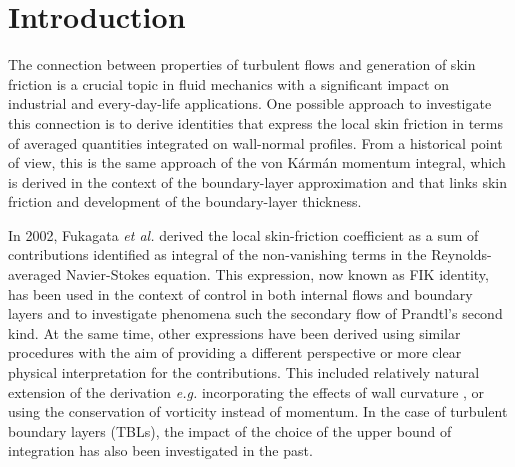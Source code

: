 

\section{Introduction}
The connection between properties of turbulent flows and generation of skin friction is a crucial topic in fluid mechanics with a significant impact on industrial and every-day-life applications. One possible approach to investigate this connection is to derive identities that express the local skin friction in terms of averaged quantities integrated on wall-normal profiles. From a historical point of view, this is the same approach of the von K\'arm\'an momentum integral, which is derived in the context of the boundary-layer approximation and that links skin friction and development of the boundary-layer thickness. 


In 2002, Fukagata \textit{et al.}\cite{Fukagata2002} derived the local skin-friction coefficient as a sum of contributions identified as integral of the non-vanishing terms in the Reynolds-averaged Navier-Stokes equation. This expression, now known as FIK identity, has been used in the context of control in both internal flows and boundary layers\cite{Peet2009,Mehdi2011,kame11,kame15,stro15} and to investigate phenomena such the secondary flow of Prandtl's second kind\cite{mode18}. At the same time, other expressions have been derived using similar procedures with the aim of providing a different perspective or more clear physical interpretation for the contributions. This included relatively natural extension of the derivation \textit{e.g.} incorporating the effects of wall curvature \cite{monte11}, or using the conservation of vorticity instead of momentum\cite{Yoon2016}. In the case of turbulent boundary layers (TBLs), the impact of the choice of the upper bound of integration has also been investigated in the past\cite{Mehdi2014}. 


